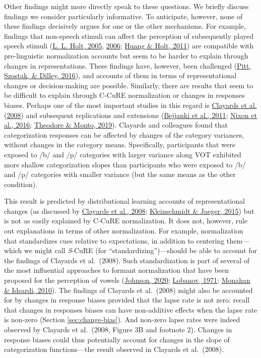 \documentclass[
  11pt,
  english,
  man,floatsintext]{apa6}
\begin{document}
Other findings might more directly speak to these questions. We briefly discuss findings we consider particularly informative. To anticipate, however, none of these findings decisively argues for one or the other mechanisms. For example, findings that non-speech stimuli can affect the perception of subsequently played speech stimuli (\protect\hyperlink{ref-holt2005}{L. L. Holt, 2005}, \protect\hyperlink{ref-holt2006}{2006}; \protect\hyperlink{ref-huang-holt2011}{Huang \& Holt, 2011}) are compatible with pre-linguistic normalization accounts but seem to be harder to explain through changes in representations. These findings have, however, been challenged (\protect\hyperlink{ref-pitt2016}{Pitt, Szostak, \& Dilley, 2016}), and accounts of them in terms of representational changes or decision-making are possible. Similarly, there are results that seem to be difficult to explain through C-CuRE normalization or changes in responses biases. Perhaps one of the most important studies in this regard is \protect\hyperlink{ref-clayards2008}{Clayards et al.} (\protect\hyperlink{ref-clayards2008}{2008}) and subsequent replications and extensions (\protect\hyperlink{ref-bejjanki2011}{Bejjanki et al., 2011}; \protect\hyperlink{ref-nixon2016}{Nixon et al., 2016}; \protect\hyperlink{ref-theodore-monto2019}{Theodore \& Monto, 2019}). Clayards and colleagues found that categorization responses can be affected by changes of the category variances, without changes in the category means. Specifically, participants that were exposed to /b/ and /p/ categories with larger variance along VOT exhibited more shallow categorization slopes than participants who were exposed to /b/ and /p/ categories with smaller variance (but the same means as the other condition).

This result is predicted by distributional learning accounts of representational changes (as discussed by \protect\hyperlink{ref-clayards2008}{Clayards et al., 2008}; \protect\hyperlink{ref-kleinschmidt-jaeger2015}{Kleinschmidt \& Jaeger, 2015}) but is not as easily explained by C-CuRE normalization. It does not, however, rule out explanations in terms of other normalization. For example, normalization that standardizes cues relative to expectations, in addition to centering them---which we might call \emph{S}-CuRE (for ``standardizing'')---should be able to account for the findings of Clayards et al.~(2008). Such standardization is part of several of the most influential approaches to formant normalization that have been proposed for the perception of vowels (\protect\hyperlink{ref-johnson2020}{Johnson, 2020}; \protect\hyperlink{ref-lobanov1971}{Lobanov, 1971}; \protect\hyperlink{ref-monahan-idsardi2010}{Monahan \& Idsardi, 2010}). The findings of Clayards et al.~(2008) might also be accounted for by changes in response biases provided that the lapse rate is not zero: recall that changes in responses biases can have non-additive effects when the lapse rate is non-zero (Section \ref{sec:change-bias}). And non-zero lapse rates were indeed observed by Clayards et al.~(2008, Figure 3B and footnote 2). Changes in response biases could thus potentially account for changes in the slope of categorization functions---the result observed in Clayards et al.~(2008).
\end{document}

